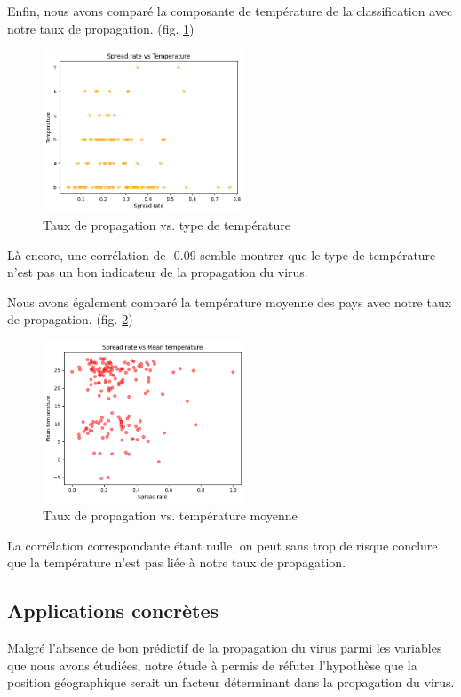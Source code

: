 \documentclass[12pt]{iEEEtran}
\begin{document}
Enfin, nous avons comparé la composante de température de la classification avec notre taux de propagation.
(fig. \ref{fig:spread_temp})

\begin{figure}[h]
    \centering
    \includegraphics[width=6cm]{img/spread_temp.png}
    \caption{Taux de propagation vs. type de température}
    \label{fig:spread_temp}
\end{figure}

Là encore, une corrélation de -0.09 semble montrer que le type de température n'est pas un bon indicateur
de la propagation du virus.

Nous avons également comparé la température moyenne des pays avec notre taux de propagation. (fig. \ref{fig:spread_mean_temp})

\begin{figure}[h]
    \centering
    \includegraphics[width=6cm]{img/spread_mean_temp.png}
    \caption{Taux de propagation vs. température moyenne}
    \label{fig:spread_mean_temp}
\end{figure}

La corrélation correspondante étant nulle, on peut sans trop de risque conclure que la température
n'est pas liée à notre taux de propagation.

\subsection{Applications concrètes}
Malgré l'absence de bon prédictif de la propagation du virus parmi les variables que nous avons
étudiées, notre étude à permis de réfuter l'hypothèse que la position géographique serait un facteur
déterminant dans la propagation du virus.
\end{document}
